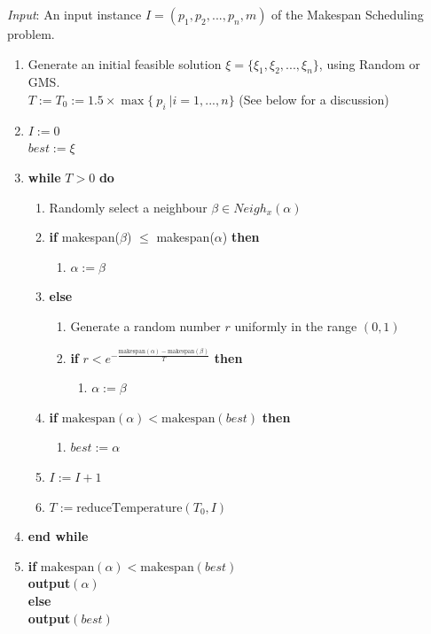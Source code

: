\documentclass[12pt,a4paper,reqno]{article}
\begin{document}
\emph{Input}: An input instance $I = (p_1,p_2,...,p_n,m)$ of the Makespan Scheduling problem.
\begin{enumerate}
\item Generate an initial feasible solution $\xi = \{\xi_1,\xi_2,...,\xi_n\}$, using Random or GMS. \\
$T := T_0 := 1.5 \times \max\{ \> p_i \>  | i = 1,...,n \}$ (See below for a discussion)
\item $I := 0$ \\
$best:=\xi$
\item\textbf{while} $T>0$ \textbf{do}
\begin{enumerate}
\item Randomly select a neighbour $\beta\in Neigh_x(\alpha)$
\item \textbf{if} makespan($\beta$) $\leq$ makespan($\alpha$) \textbf{then}
\begin{enumerate}
\item $\alpha:=\beta$
\end{enumerate}
\item[] \textbf{else}
\begin{enumerate}
\item Generate a random number $r$ uniformly in the range $(0,1)$
\item \textbf{if} $r<e^{-\frac{\text{makespan}(\alpha)-\text{makespan}(\beta)}{T}}$ \textbf{then}
\begin{enumerate}
\item[] $\alpha:=\beta$
\end{enumerate}
\end{enumerate}
\item \textbf{if}
$\text{makespan}(\alpha) < \text{makespan}(best)$ \textbf{then}
\begin{enumerate}
\item[] $best:=\alpha$
\end{enumerate}
\item $I:=I+1$
\item $T:=\text{reduceTemperature}(T_0,I)$
\end{enumerate}
\item[] \textbf{end while}
\item \textbf{if} $\text{makespan}(\alpha) < \text{makespan}(best)$ \\
\indent \textbf{output}$(\alpha)$ \\
\textbf{else} \\
\indent \textbf{output}$(best)$
\end{enumerate}
\end{document}
